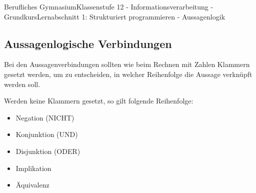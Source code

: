 \documentclass[11pt,oneside,openany,headings=optiontotoc,11pt,numbers=noenddot]{article}
\begin{document}
\begin{worksheet}{Berufliches Gymnasium}{Klassenstufe 12 - Informationsverarbeitung - Grundkurs}{Lernabschnitt 1: Strukturiert programmieren - Aussagenlogik}
		\subsection{Aussagenlogische Verbindungen}
		Bei den Aussagenverbindungen sollten wie beim Rechnen mit Zahlen Klammern gesetzt werden, um zu entscheiden, in welcher Reihenfolge die Aussage verknüpft werden soll.\\
		\par\noindent
		Werden keine Klammern gesetzt, so gilt folgende Reihenfolge:
		\begin{itemize}[label=-]
			\item Negation (NICHT)
			\item Konjunktion (UND)
			\item Disjunktion (ODER)
			\item Implikation
			\item Äquivalenz
		\end{itemize}
	\end{worksheet}
\end{document}
